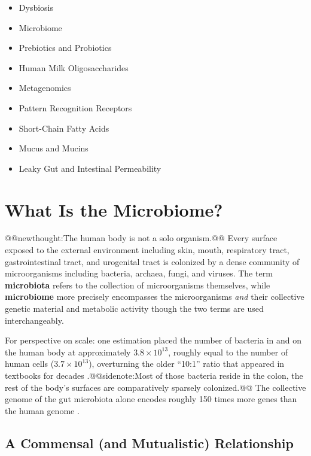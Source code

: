 \documentclass{tufte-handout}
\makeatletter
\def\newthought#1{@@newthought:#1@@}
\def\sidenote#1{@@sidenote:#1@@}
\makeatother
\begin{document}
\begin{itemize}
  \item Dysbiosis
  \item Microbiome
  \item Prebiotics and Probiotics
  \item Human Milk Oligosaccharides
  \item Metagenomics
  \item Pattern Recognition Receptors
  \item Short-Chain Fatty Acids
  \item Mucus and Mucins
  \item Leaky Gut and Intestinal Permeability
\end{itemize}

\section{What Is the Microbiome?}

\newthought{The human body is not a solo organism.} Every surface exposed to the external environment including skin, mouth, respiratory tract, gastrointestinal tract, and urogenital tract is colonized by a dense community of microorganisms including bacteria, archaea, fungi, and viruses. The term \textbf{microbiota} refers to the collection of microorganisms themselves, while \textbf{microbiome} more precisely encompasses the microorganisms \emph{and} their collective genetic material and metabolic activity though the two terms are used interchangeably.

For perspective on scale: one estimation placed the number of bacteria in and on the human body at approximately $3.8 \times 10^{13}$, roughly equal to the number of human cells ($3.7 \times 10^{13}$), overturning the older ``10:1'' ratio that appeared in textbooks for decades \citep{senderRevisedEstimatesNumber2016}.\sidenote{Most of those bacteria reside in the colon, the rest of the body's surfaces are comparatively sparsely colonized.} The collective genome of the gut microbiota alone encodes roughly 150 times more genes than the human genome \citep{qinHumanGutMicrobial2010}.

\subsection{A Commensal (and Mutualistic) Relationship}
\end{document}
